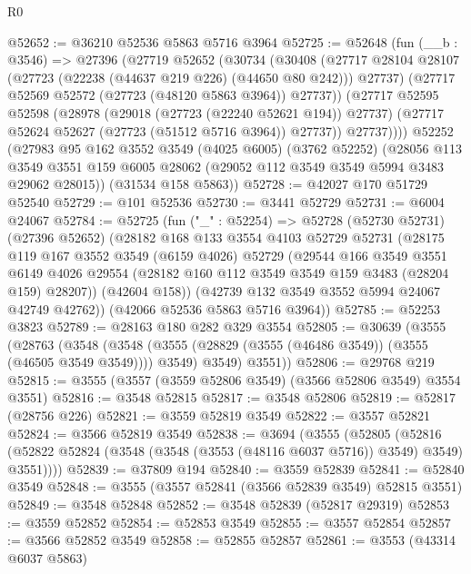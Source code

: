 \begin{lexlean}{R0}
\begin{coremodule}
@52652 := @36210 @52536 @5863 @5716 @3964
@52725 := @52648
    (fun (__b : @3546) =>
    @27396
      (@27719
        @52652
        (@30734
          (@30408
            (@27717 @28104 @28107 (@27723 (@22238 (@44637 @219 @226) (@44650 @80 @242))) @27737)
            (@27717 @52569 @52572 (@27723 (@48120 @5863 @3964)) @27737))
          (@27717
            @52595
            @52598
            (@28978
              (@29018 (@27723 (@22240 @52621 @194)) @27737)
              (@27717 @52624 @52627 (@27723 (@51512 @5716 @3964)) @27737))
            @27737))))
    @52252
    (@27983
      @95
      @162
      @3552
      @3549
      (@4025 @6005)
      (@3762 @52252)
      (@28056
        @113
        @3549
        @3551
        @159
        @6005
        @28062
        (@29052 @112 @3549 @3549 @5994 @3483 @29062 @28015))
      (@31534 @158 @5863))
@52728 := @42027 @170 @51729 @52540
@52729 := @101 @52536
@52730 := @3441 @52729
@52731 := @6004 @24067
@52784 := @52725
    (fun ("_" : @52254) =>
    @52728
      (@52730 @52731)
      (@27396 @52652)
      (@28182
        @168
        @133
        @3554
        @4103
        @52729
        @52731
        (@28175
          @119
          @167
          @3552
          @3549
          (@6159 @4026)
          @52729
          (@29544
            @166
            @3549
            @3551
            @6149
            @4026
            @29554
            (@28182 @160 @112 @3549 @3549 @159 @3483 (@28204 @159) @28207))
          (@42604 @158))
        (@42739 @132 @3549 @3552 @5994 @24067 @42749 @42762))
      (@42066 @52536 @5863 @5716 @3964))
@52785 := @52253 @3823
@52789 := @28163 @180 @282 @329 @3554
@52805 := @30639
    (@3555
      (@28763
        (@3548
          (@3548 (@3555 (@28829 (@3555 (@46486 @3549)) (@3555 (@46505 @3549 @3549)))) @3549)
          @3549)
        @3551))
@52806 := @29768 @219
@52815 := @3555 (@3557 (@3559 @52806 @3549) (@3566 @52806 @3549) @3554 @3551)
@52816 := @3548 @52815
@52817 := @3548 @52806
@52819 := @52817 (@28756 @226)
@52821 := @3559 @52819 @3549
@52822 := @3557 @52821
@52824 := @3566 @52819 @3549
@52838 := @3694
    (@3555
      (@52805
        (@52816 (@52822 @52824 (@3548 (@3548 (@3553 (@48116 @6037 @5716)) @3549) @3549) @3551))))
@52839 := @37809 @194
@52840 := @3559 @52839
@52841 := @52840 @3549
@52848 := @3555 (@3557 @52841 (@3566 @52839 @3549) @52815 @3551)
@52849 := @3548 @52848
@52852 := @3548 @52839 (@52817 @29319)
@52853 := @3559 @52852
@52854 := @52853 @3549
@52855 := @3557 @52854
@52857 := @3566 @52852 @3549
@52858 := @52855 @52857
@52861 := @3553 (@43314 @6037 @5863)

\end{coremodule}
\end{lexlean}
